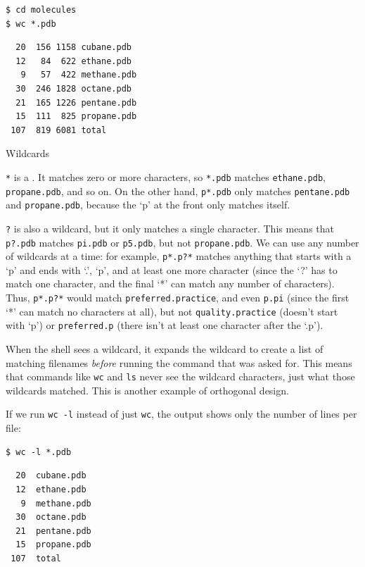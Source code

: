 \documentclass{book}
\begin{document}
\begin{verbatim}
$ cd molecules
$ wc *.pdb
\end{verbatim}

\begin{verbatim}
  20  156 1158 cubane.pdb
  12   84  622 ethane.pdb
   9   57  422 methane.pdb
  30  246 1828 octane.pdb
  21  165 1226 pentane.pdb
  15  111  825 propane.pdb
 107  819 6081 total
\end{verbatim}

\begin{swcbox}{Wildcards}

\texttt{*} is a . It matches zero or more
characters, so \texttt{*.pdb} matches \texttt{ethane.pdb},
\texttt{propane.pdb}, and so on. On the other hand, \texttt{p*.pdb} only
matches \texttt{pentane.pdb} and \texttt{propane.pdb}, because the `p'
at the front only matches itself.

\texttt{?} is also a wildcard, but it only matches a single character.
This means that \texttt{p?.pdb} matches \texttt{pi.pdb} or
\texttt{p5.pdb}, but not \texttt{propane.pdb}. We can use any number of
wildcards at a time: for example, \texttt{p*.p?*} matches anything that
starts with a `p' and ends with `.', `p', and at least one more
character (since the `?' has to match one character, and the final `*'
can match any number of characters). Thus, \texttt{p*.p?*} would match
\texttt{preferred.practice}, and even \texttt{p.pi} (since the first `*'
can match no characters at all), but not \texttt{quality.practice}
(doesn't start with `p') or \texttt{preferred.p} (there isn't at least
one character after the `.p').

When the shell sees a wildcard, it expands the wildcard to create a list
of matching filenames \emph{before} running the command that was asked
for. This means that commands like \texttt{wc} and \texttt{ls} never see
the wildcard characters, just what those wildcards matched. This is
another example of orthogonal design.

\end{swcbox}

If we run \texttt{wc -l} instead of just \texttt{wc}, the output shows
only the number of lines per file:

\begin{verbatim}
$ wc -l *.pdb
\end{verbatim}

\begin{verbatim}
  20  cubane.pdb
  12  ethane.pdb
   9  methane.pdb
  30  octane.pdb
  21  pentane.pdb
  15  propane.pdb
 107  total
\end{verbatim}
\end{document}
